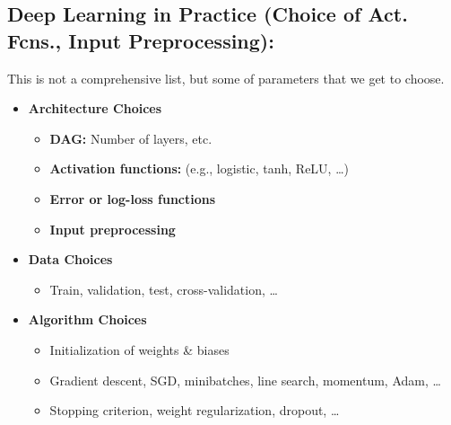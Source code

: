 \subsection{Deep Learning in Practice (Choice of Act. Fcns., Input Preprocessing):}
\begin{summary}
    This is not a comprehensive list, but some of parameters that we get to choose. 
    \begin{itemize}
        \item \textbf{Architecture Choices}
        \begin{itemize}
            \item \textbf{DAG:} Number of layers, etc.
            \item \textbf{Activation functions:} (e.g., logistic, tanh, ReLU, \dots)
            \item \textbf{Error or log-loss functions}
            \item \textbf{Input preprocessing}
        \end{itemize}
    
        \item \textbf{Data Choices}
        \begin{itemize}
            \item Train, validation, test, cross-validation, \dots
        \end{itemize}
    
        \item \textbf{Algorithm Choices}
        \begin{itemize}
            \item Initialization of weights \& biases
            \item Gradient descent, SGD, minibatches, line search, momentum, Adam, \dots
            \item Stopping criterion, weight regularization, dropout, \dots
        \end{itemize}
    \end{itemize}
\end{summary}

